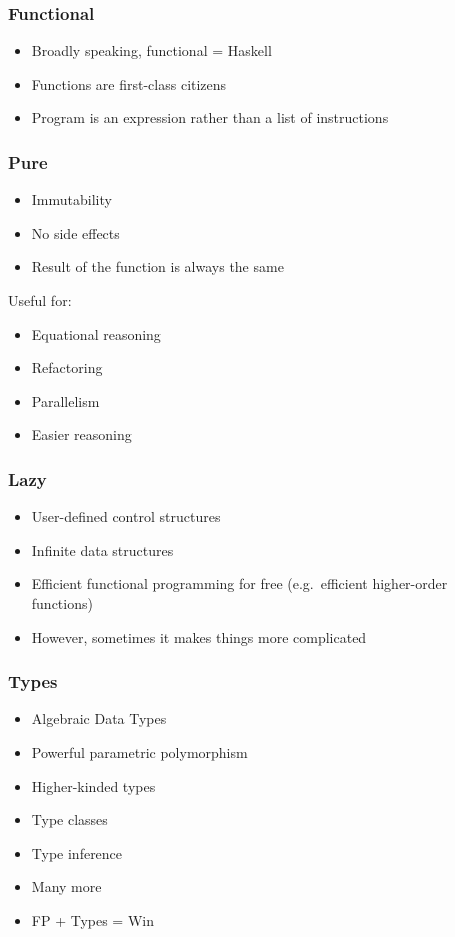 \documentclass[pdf,aspectratio=169]{beamer}
\begin{document}
\begin{frame}
  \frametitle{Functional}
  \begin{itemize}
    \pause
    \item Broadly speaking, functional = Haskell
    \pause
    \item Functions are first-class citizens
    \pause
    \item Program is an expression rather than a list of instructions
  \end{itemize}
\end{frame}

\begin{frame}
  \frametitle{Pure}
  \begin{itemize}
    \pause
    \item Immutability
    \pause
    \item No side effects
    \pause
    \item Result of the function is always the same
  \end{itemize}
  \pause
  \vspace{1ex}
  Useful for:
  \begin{itemize}
    \pause
    \item Equational reasoning
    \pause
    \item Refactoring
    \pause
    \item Parallelism
    \pause
    \item Easier reasoning
  \end{itemize}
\end{frame}

\begin{frame}
  \frametitle{Lazy}
  \begin{itemize}
    \pause
    \item User-defined control structures
    \pause
    \item Infinite data structures
    \pause
    \item Efficient functional programming for free
      (e.g.\ efficient higher-order functions)
    \pause
    \item However, sometimes it makes things more complicated
  \end{itemize}
\end{frame}

\begin{frame}
  \frametitle{Types}
  \begin{itemize}
    \pause
    \item Algebraic Data Types
    \pause
    \item Powerful parametric polymorphism
    \pause
    \item Higher-kinded types
    \pause
    \item Type classes
    \pause
    \item Type inference
    \pause
    \item Many more
    \pause
    \item FP + Types = Win
  \end{itemize}
\end{frame}
\end{document}

